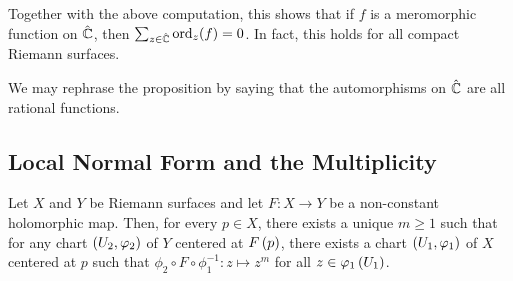 \documentclass[../Moduli_Spaces_of_Riemann_Surfaces.tex]{subfiles}
\begin{document}
    \begin{remark}
        Together with the above computation, this shows that if $f$ is a meromorphic function on $\hat{\mathbb{C}}$, then $\sum_{z\in\hat{\mathbb{C}}}\operatorname{ord}_z\!\left(f\right)=0$. In fact, this holds for all compact Riemann surfaces.\exqed
    \end{remark}
    \begin{remark}
        We may rephrase the proposition by saying that the automorphisms on $\hat{\mathbb{C}}$ are all rational functions.\exqed
    \end{remark}
    \subsection{Local Normal Form and the Multiplicity}
    \begin{theorem}\label{1.2:thm:local_normal_form}
        Let $X$ and $Y$ be Riemann surfaces and let $F:X\to Y$ be a non-constant holomorphic map. Then, for every $p\in X$, there exists a unique $m\geq1$ such that for any chart $\left(U_2,\varphi_2\right)$ of $Y$ centered at $F\left(p\right)$, there exists a chart $\left(U_1,\varphi_1\right)$ of $X$ centered at $p$ such that $\phi_2\circ F\circ\phi_1^{-1}:z\mapsto z^m$ for all $z\in\varphi_1\left(U_1\right)$.
    \end{theorem}
    \vspace{-0.05in}
\end{document}

